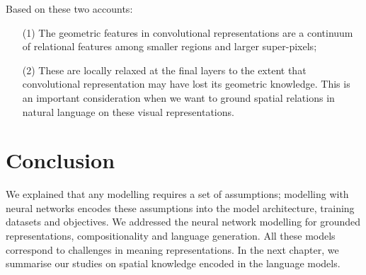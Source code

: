 Based on these two accounts:
\begin{itemize}
	\item[(1)] The geometric features in convolutional representations are a continuum of relational features among smaller regions and larger super-pixels;
	\item[(2)] These are locally relaxed at the final layers to the extent that convolutional representation may have lost its geometric knowledge.
	This is an important consideration when we want to ground spatial relations in natural language on these visual representations.
\end{itemize}

\section{Conclusion}
\label{sec:concepts:conclusion}

We explained that any modelling requires a set of assumptions; modelling with neural networks encodes these assumptions into the model architecture, training datasets and objectives. 
We addressed the neural network modelling for grounded representations, compositionality and language generation. 
All these models correspond to challenges in meaning representations. 
In the next chapter, we summarise our studies on spatial knowledge encoded in the language models.